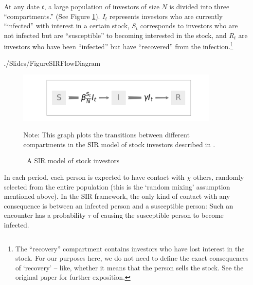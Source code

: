 At any date  $t$, a large population of investors of size $N$ is divided into three ``compartments.''  (See Figure \ref{fig:sir_diagram}).  $I_t$ represents investors who are currently ``infected'' with interest in a certain stock,  $S_t$ corresponds to investors who are not infected but are ``susceptible'' to becoming interested in the stock, and $R_t$ are investors who have been ``infected'' but have ``recovered'' from the infection.\footnote{The ``recovery'' compartment contains investors who have lost interest in the stock.  For our purposes here, we do not need to define the exact consequences of `recovery' -- like, whether it means that the person sells the stock.  See the original paper for further exposition.}
\begin{verbatimwrite}{./Slides/FigureSIRFlowDiagram}%
	\begin{figure}[!ht] \centering  %
		\caption{ ~A SIR model of stock investors}
		\label{fig:sir_diagram}
		\centerline{\includegraphics[width=0.9\textwidth]{./figures/flow_diagram}}
		\begin{flushleft}
			{\footnotesize Note: This graph plots the transitions between different compartments in the SIR model of stock investors described in \cite{shiller1989survey}. }
		\end{flushleft}
	\end{figure}
\end{verbatimwrite}%
\newcommand{\contactNum}{\chi}\newcommand{\tranProb}{\tau}\newcommand{\exposures}{\mathcal{E}}

In each period, each person is expected to have contact with $\contactNum$ others, randomly selected from the entire population (this is the `random mixing' assumption mentioned above).  In the SIR framework, the only kind of contact with any consequence is between an infected person and a susceptible person: Such an encounter has a probability $\tranProb$ of causing the susceptible person to become infected.

